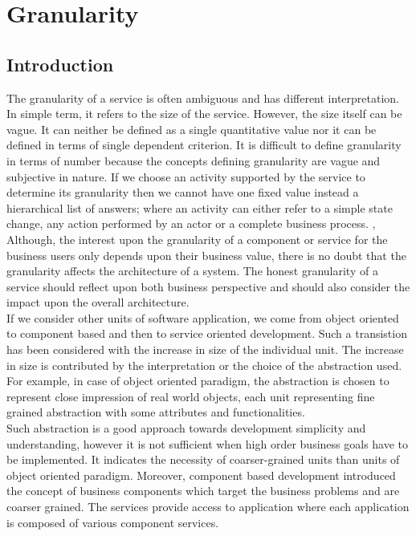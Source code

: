 \chapter{Granularity}\label{chapter:granularity}
\section{Introduction}\label{section:granularity/introduction}
The granularity of a service is often ambiguous and has different interpretation. In simple term, it refers to the size of the service. However, the size itself can be vague. It can neither be defined as a single quantitative value nor it can be defined in terms of single dependent criterion. It is difficult to define granularity in terms of number because the concepts defining granularity are vague and subjective in nature. If we choose an activity supported by the service to determine its granularity then we cannot have one fixed value instead a hierarchical list of answers; where an activity can either refer to a simple state change, any action performed by an actor or a complete business process. \cite{Linthicum:2015aa}, \cite{Raf-Haesen:2015aa}
\\
Although, the interest upon the granularity of a component or service for the business users only depends upon their business value, there is no doubt that the granularity affects the architecture of a system. The honest granularity of a service should reflect upon both business perspective and should also consider the impact upon the overall architecture.
\\
If we consider other units of software application, we come from object oriented to component based and then to service oriented development. Such a transistion has been considered with the increase in size of the individual unit. The increase in size is contributed by the interpretation or the choice of the abstraction used. For example, in case of object oriented paradigm, the abstraction is chosen to represent close impression of real world objects, each unit representing fine grained abstraction with some attributes and functionalities. 
\\
Such abstraction is a good approach towards development simplicity and understanding, however it is not sufficient when high order business goals have to be implemented. It indicates the necessity of coarser-grained units than units of object oriented paradigm. Moreover, component based development introduced the concept of business components which target the business problems and are coarser grained. The services provide access to application where each application is composed of various component services. \cite{Linthicum:2015aa}


